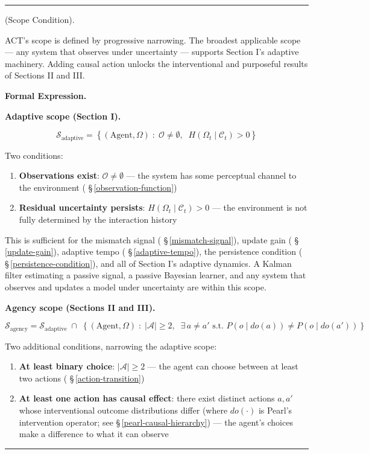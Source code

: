 \documentclass[11pt,oneside]{article}
\newcounter{claim}[section]
\renewcommand{\theclaim}{\thesection.\arabic{claim}}
\newenvironment{segment}[2]{%
  \refstepcounter{claim}%
  \bigskip\noindent\hrule\smallskip
  \noindent{\bfseries #1~\theclaim}\enskip(#2).\par\smallskip
  \noindent\ignorespaces
}{%
  \par\smallskip\noindent\hrule\bigskip
}
\newenvironment{scope}[1][]{\begin{segment}{Scope}{#1}}{\end{segment}}
\begin{document}
\begin{scope}[Scope Condition]
\label{scope-condition}
ACT's scope is defined by progressive narrowing. The broadest applicable scope — any system that observes under uncertainty — supports Section I's adaptive machinery. Adding causal action unlocks the interventional and purposeful results of Sections II and III.



\medskip\noindent\textbf{Formal Expression.}




\medskip\noindent\textbf{Adaptive scope (Section I).}


$$\mathcal S_\text{adaptive} = \left\{(\text{Agent}, \Omega) \;:\; \mathcal O \neq \emptyset, \;\; H(\Omega_t \mid \mathcal C_t) > 0 \right\}$$

Two conditions:

\begin{enumerate}
  \item \textbf{Observations exist}: $\mathcal O \neq \emptyset$ — the system has some perceptual channel to the environment ( \S\,\ref{observation-function})
  \item \textbf{Residual uncertainty persists}: $H(\Omega_t \mid \mathcal C_t) > 0$ — the environment is not fully determined by the interaction history
\end{enumerate}


This is sufficient for the mismatch signal ( \S\,\ref{mismatch-signal}), update gain ( \S\,\ref{update-gain}), adaptive tempo ( \S\,\ref{adaptive-tempo}), the persistence condition ( \S\,\ref{persistence-condition}), and all of Section I's adaptive dynamics. A Kalman filter estimating a passive signal, a passive Bayesian learner, and any system that observes and updates a model under uncertainty are within this scope.


\medskip\noindent\textbf{Agency scope (Sections II and III).}


$$\mathcal S_\text{agency} = \mathcal S_\text{adaptive} \;\cap\; \left\{(\text{Agent}, \Omega) \;:\; \lvert\mathcal A\rvert \geq 2, \;\; \exists\, a \neq a' \text{ s.t. } P(o \mid do(a)) \neq P(o \mid do(a')) \right\}$$

Two additional conditions, narrowing the adaptive scope:

\begin{enumerate}
  \item \textbf{At least binary choice}: $\lvert\mathcal A\rvert \geq 2$ — the agent can choose between at least two actions ( \S\,\ref{action-transition})
  \item \textbf{At least one action has causal effect}: there exist distinct actions $a, a'$ whose interventional outcome distributions differ (where $do(\cdot)$ is Pearl's intervention operator; see \S\,\ref{pearl-causal-hierarchy}) — the agent's choices make a difference to what it can observe
\end{enumerate}



\end{scope}
\end{document}
